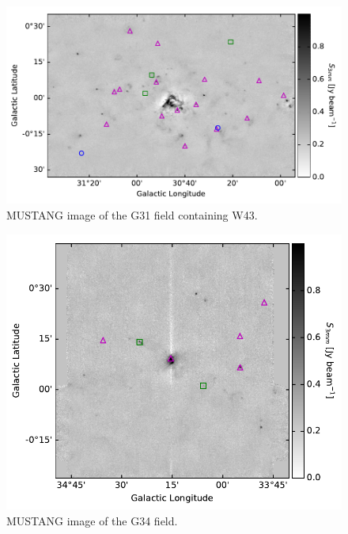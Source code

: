 \documentclass[twocolumn]{aastex62}
\begin{document}
\begin{figure}[htp]
    \includegraphics[width=17cm]{figures/G31_overview_withcatalog.pdf}
\caption{MUSTANG image of the G31 field containing W43.
}
\label{fig:w43overview}
\end{figure}


\begin{figure}[htp]
\includegraphics[width=17cm]{figures/G34_overview_withcatalog.pdf}
\caption{MUSTANG image of the G34 field.}
\label{fig:g34overview}
\end{figure}
\end{document}
